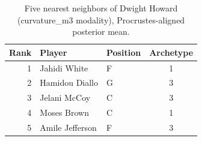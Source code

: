 \begin{table}[htbp]
  \centering\small
  \begin{tabular}{rllc}
    \toprule
    Rank & Player & Position & Archetype \\
    \midrule
    1 & Jahidi White & F & 1 \\
    2 & Hamidou Diallo & G & 3 \\
    3 & Jelani McCoy & C & 3 \\
    4 & Moses Brown & C & 1 \\
    5 & Amile Jefferson & F & 3 \\
    \bottomrule
  \end{tabular}
  \caption{Five nearest neighbors of Dwight Howard (curvature_m3 modality), Procrustes-aligned posterior mean.}
  \label{tab:Dwight_Howard_neighbors_curvature_m3}
\end{table}

